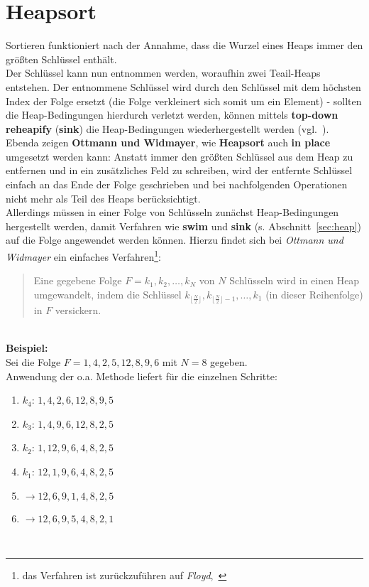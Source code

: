 \section{Heapsort}

\noindent
Sortieren funktioniert nach der Annahme, dass die Wurzel eines Heaps immer den größten Schlüssel enthält.\\
Der Schlüssel kann nun entnommen werden, woraufhin zwei Teail-Heaps entstehen.
Der entnommene Schlüssel wird durch den Schlüssel mit dem höchsten Index der Folge ersetzt (die Folge verkleinert sich somit um ein Element) - sollten die Heap-Bedingungen hierdurch verletzt werden, können mittels \textbf{top-down reheapify} (\textbf{sink}) die Heap-Bedingungen wiederhergestellt werden (vgl.~\cite[107 f.]{OW17b}).\\

\noindent
Ebenda zeigen \textbf{Ottmann und Widmayer}, wie \textbf{Heapsort} auch \textbf{in place} umgesetzt werden kann: Anstatt immer den größten Schlüssel aus dem Heap zu entfernen und in ein zusätzliches Feld zu schreiben, wird der entfernte Schlüssel einfach an das Ende der Folge geschrieben und bei nachfolgenden Operationen nicht mehr als Teil des Heaps berücksichtigt.\\

\noindent
Allerdings müssen in einer Folge von Schlüsseln zunächst Heap-Bedingungen hergestellt werden, damit Verfahren wie \textbf{swim} und \textbf{sink} (s. Abschnitt~\ref{sec:heap}) auf die Folge angewendet werden können.
Hierzu findet sich bei \textit{Ottmann und Widmayer} ein einfaches Verfahren\footnote{
das Verfahren ist zurückzuführen auf \textit{Floyd},~\cite{Flo64}
}:

\blockquote[{\cite[111]{OW17b}}]{
    Eine gegebene Folge $F=k_1,k_2,\ldots,k_N$ von $N$ Schlüsseln wird in einen Heap umgewandelt, indem die Schlüssel $k_{\lfloor \frac{N}{2} \rfloor}, k_{\lfloor \frac{N}{2} \rfloor -1}, \ldots, k_1$ (in dieser Reihenfolge) in $F$ versickern.
}\\

\noindent
\textbf{Beispiel:}\\
Sei die Folge $F=1, 4, 2, 5, 12, 8, 9, 6$ mit $N=8$ gegeben.\\
Anwendung der o.a. Methode liefert für die einzelnen Schritte:

\begin{enumerate}
    \item $k_4$: $1, 4, 2, 6, 12, 8, 9, 5$
    \item $k_3$: $1, 4, 9, 6, 12, 8, 2, 5$
    \item $k_2$: $1, 12, 9, 6, 4, 8, 2, 5$
    \item $k_1$: $12, 1, 9, 6, 4, 8, 2, 5$
    \item[] $\rightarrow 12, 6, 9, 1, 4, 8, 2, 5$
    \item[] $\rightarrow 12, 6, 9, 5, 4, 8, 2, 1$
\end{enumerate}\\

